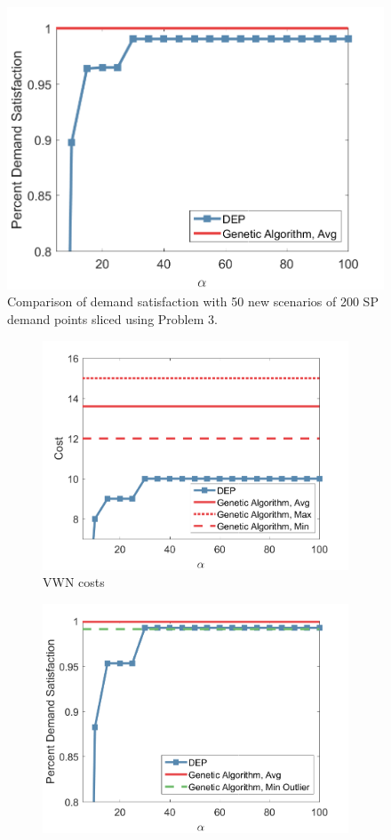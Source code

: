 \documentclass[conference]{IEEEtran}
\begin{document}
\begin{figure}[t]
	\centering
	\includegraphics[width=.3\textwidth]{Figures/ComparisonSatisfactionEval}
	\caption{\small Comparison of demand satisfaction with 50 new scenarios of 200 SP demand points sliced using Problem 3.}
	\label{fig:VWNEvalCompSatis}
\end{figure}
\fi

\begin{figure}[t]
\centering
\begin{subfigure}{.3\textwidth}
	\centering
	\includegraphics[width=1\linewidth]{Figures/ComparisonCost}
	\caption{VWN costs}
	\label{fig:VWNCompCost}
\end{subfigure}
\hspace{0.3cm}
\begin{subfigure}{.3\textwidth}
	\centering
	\includegraphics[width=1\linewidth]{Figures/ComparisonSatisfaction}

\end{subfigure}
\end{figure}
\end{document}

